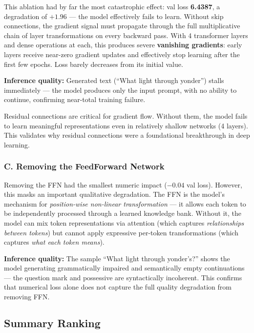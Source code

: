 \documentclass[12pt,a4paper]{article}
\newenvironment{keyinsight}{%
  \begin{tcolorbox}[colback=lightblue!60, colframe=accentblue,
    fonttitle=\bfseries\small\color{navyblue},
    title={Key Insight}, boxrule=0.6pt,
    left=6pt, right=6pt, top=4pt, bottom=4pt]%
}{\end{tcolorbox}}
\begin{document}
This ablation had by far the most catastrophic effect: val loss \textbf{6.4387}, a degradation of $+1.96$ — the model effectively fails to learn. Without skip connections, the gradient signal must propagate through the full multiplicative chain of layer transformations on every backward pass. With 4 transformer layers and dense operations at each, this produces severe \textbf{vanishing gradients}: early layers receive near-zero gradient updates and effectively stop learning after the first few epochs. Loss barely decreases from its initial value.

\textbf{Inference quality:} Generated text (``What light through yonder'') stalls immediately — the model produces only the input prompt, with no ability to continue, confirming near-total training failure.

\begin{keyinsight}
Residual connections are critical for gradient flow. Without them, the model fails to learn meaningful representations even in relatively shallow networks (4 layers). This validates why residual connections were a foundational breakthrough in deep learning.
\end{keyinsight}

\subsubsection{C. Removing the FeedForward Network}

Removing the FFN had the smallest numeric impact ($-0.04$ val loss). However, this masks an important qualitative degradation. The FFN is the model's mechanism for \textit{position-wise non-linear transformation} — it allows each token to be independently processed through a learned knowledge bank. Without it, the model can mix token representations via attention (which captures \textit{relationships between tokens}) but cannot apply expressive per-token transformations (which captures \textit{what each token means}).

\textbf{Inference quality:} The sample ``What light through yonder's?'' shows the model generating grammatically impaired and semantically empty continuations — the question mark and possessive are syntactically incoherent. This confirms that numerical loss alone does not capture the full quality degradation from removing FFN.

\subsection{Summary Ranking}
\end{document}
